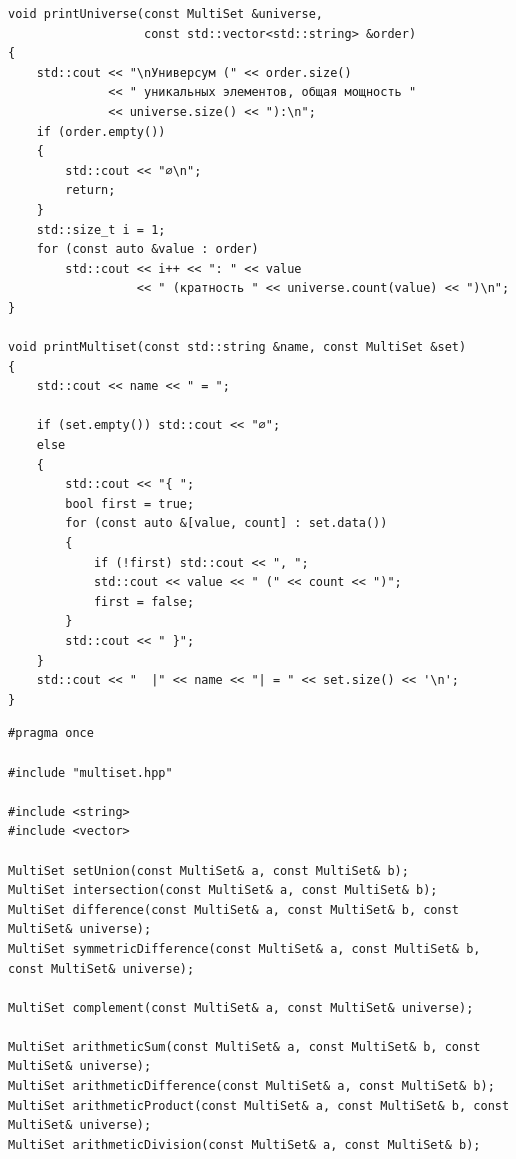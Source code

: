 \documentclass[14pt,a4paper]{extreport}
\begin{document}
\begin{listing}[H]
\begin{lstlisting}
void printUniverse(const MultiSet &universe,
                   const std::vector<std::string> &order)
{
    std::cout << "\nУниверсум (" << order.size()
              << " уникальных элементов, общая мощность "
              << universe.size() << "):\n";
    if (order.empty())
    {
        std::cout << "∅\n";
        return;
    }
    std::size_t i = 1;
    for (const auto &value : order)
        std::cout << i++ << ": " << value
                  << " (кратность " << universe.count(value) << ")\n";
}

void printMultiset(const std::string &name, const MultiSet &set)
{
    std::cout << name << " = ";

    if (set.empty()) std::cout << "∅";
    else
    {
        std::cout << "{ ";
        bool first = true;
        for (const auto &[value, count] : set.data())
        {
            if (!first) std::cout << ", ";
            std::cout << value << " (" << count << ")";
            first = false;
        }
        std::cout << " }";
    }
    std::cout << "  |" << name << "| = " << set.size() << '\n';
}
\end{lstlisting}
\end{listing}

\begin{listing}[H]
\caption{operations.hpp}
\begin{lstlisting}
#pragma once

#include "multiset.hpp"

#include <string>
#include <vector>

MultiSet setUnion(const MultiSet& a, const MultiSet& b);
MultiSet intersection(const MultiSet& a, const MultiSet& b);
MultiSet difference(const MultiSet& a, const MultiSet& b, const MultiSet& universe);
MultiSet symmetricDifference(const MultiSet& a, const MultiSet& b, const MultiSet& universe);

MultiSet complement(const MultiSet& a, const MultiSet& universe);

MultiSet arithmeticSum(const MultiSet& a, const MultiSet& b, const MultiSet& universe);
MultiSet arithmeticDifference(const MultiSet& a, const MultiSet& b);
MultiSet arithmeticProduct(const MultiSet& a, const MultiSet& b, const MultiSet& universe);
MultiSet arithmeticDivision(const MultiSet& a, const MultiSet& b);
\end{lstlisting}
\end{listing}
\end{document}
